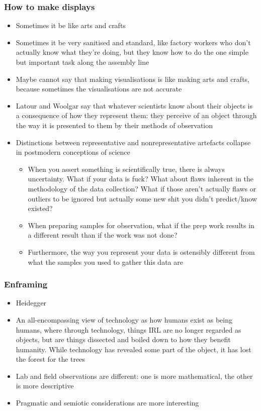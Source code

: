 \documentclass[a4paper]{article}
\begin{document}
\subsubsection{How to make displays}
\begin{itemize}
	\item Sometimes it be like arts and crafts
	\item Sometimes it be very sanitised and standard, like factory workers who don’t actually know what they’re doing, but they know how to do the one simple but important task along the assembly line
	\item Maybe cannot say that making visualisations is like making arts and crafts, because sometimes the visualisations are not accurate
	\item Latour and Woolgar say that whatever scientists know about their objects is a consequence of how they represent them: they perceive of an object through the way it is presented to them by their methods of observation
	\item Distinctions between representative and nonrepresentative artefacts collapse in postmodern conceptions of science
	\begin{itemize}[label=$\circ$]
		\item When you assert something is scientifically true, there is always uncertainty. What if your data is fuck? What about flaws inherent in the methodology of the data collection? What if those aren’t actually flaws or outliers to be ignored but actually some new shit you didn’t predict/know existed?
		\item When preparing samples for observation, what if the prep work results in a different result than if the work was not done?
		\item Furthermore, the way you represent your data is ostensibly different from what the samples you used to gather this data are
	\end{itemize}
\end{itemize}
\subsubsection{Enframing}
\begin{itemize}
	\item Heidegger
	\item An all-encompassing view of technology as how humans exist as being humans, where through technology, things IRL are no longer regarded as objects, but are things dissected and boiled down to how they benefit humanity. While technology has revealed some part of the object, it has lost the forest for the trees
	\item Lab and field observations are different: one is more mathematical, the other is more descriptive
	\item Pragmatic and semiotic considerations are more interesting
\end{itemize}
\end{document}
